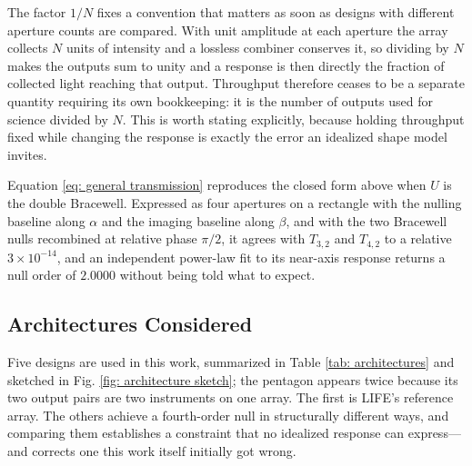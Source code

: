 \documentclass[12pt,a4paper]{article}
\numberwithin{equation}{section}
\numberwithin{figure}{section}
\numberwithin{table}{section}
\begin{document}
The factor $1/N$ fixes a convention that matters as soon as designs with different aperture counts are compared. With unit amplitude at each aperture the array collects $N$ units of intensity and a lossless combiner conserves it, so dividing by $N$ makes the outputs sum to unity and a response is then directly the fraction of collected light reaching that output. Throughput therefore ceases to be a separate quantity requiring its own bookkeeping: it is the number of outputs used for science divided by $N$. This is worth stating explicitly, because holding throughput fixed while changing the response is exactly the error an idealized shape model invites.

Equation \ref{eq: general transmission} reproduces the closed form above when $U$ is the double Bracewell. Expressed as four apertures on a rectangle with the nulling baseline along $\alpha$ and the imaging baseline along $\beta$, and with the two Bracewell nulls recombined at relative phase $\pi/2$, it agrees with $T_{3,2}$ and $T_{4,2}$ to a relative $3\times10^{-14}$, and an independent power-law fit to its near-axis response returns a null order of $2.0000$ without being told what to expect.

\subsection{Architectures Considered} \label{sec: methods: architectures}
Five designs are used in this work, summarized in Table \ref{tab: architectures} and sketched in Fig. \ref{fig: architecture sketch}; the pentagon appears twice because its two output pairs are two instruments on one array. The first is LIFE's reference array. The others achieve a fourth-order null in structurally different ways, and comparing them establishes a constraint that no idealized response can express---and corrects one this work itself initially got wrong.
\end{document}
